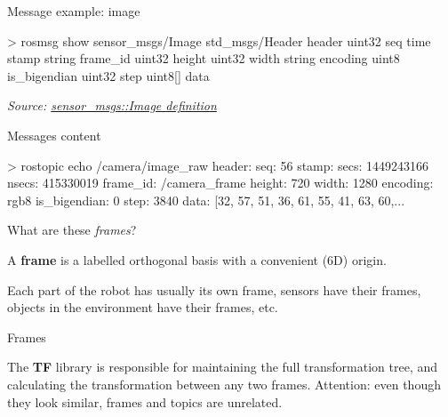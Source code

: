 \documentclass[compress]{beamer}
\newcommand{\source}[2]{{\tiny\it Source: \href{#1}{#2}}}
\begin{document}
\begin{frame}[fragile]{Message example: image}
\begin{shcode}
> rosmsg show sensor_msgs/Image 
std_msgs/Header header
    uint32 seq
    time stamp
    string frame_id
uint32 height
uint32 width
string encoding
uint8 is_bigendian
uint32 step
uint8[] data
\end{shcode}

\source{http://docs.ros.org/api/sensor_msgs/html/msg/Image.html}{sensor\_msgs::Image definition}
\end{frame}

\begin{frame}[fragile]{Messages content}
\begin{shcode}
> rostopic echo /camera/image_raw 
header: 
    seq: 56
    stamp: 
      secs: 1449243166
      nsecs: 415330019
    frame_id: /camera_frame
height: 720
width: 1280
encoding: rgb8
is_bigendian: 0
step: 3840
data: [32, 57, 51, 36, 61, 55, 41, 63, 60,...
\end{shcode}
\end{frame}

\begin{frame}[plain]
    \begin{center}
        What are these \emph{frames}?
    \end{center}

    \pause

    A \textbf{frame} is a labelled orthogonal basis with a convenient (6D) origin.

    Each part of the robot has usually its own frame, sensors have their frames,
    objects in the environment have their frames, etc.
\end{frame}

\begin{frame}{Frames}
 {
    \begin{center}
    
    \end{center}
}
 {
    \begin{center}
    
    \end{center}
}

 {
    The \textbf{TF} library is responsible for maintaining the full
    transformation tree, and calculating the transformation between any two frames.
}
 {
    Attention: even though they look similar, frames and topics are unrelated.
}
\end{frame}
\end{document}
